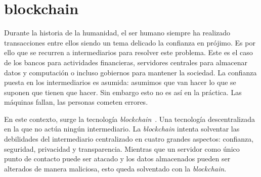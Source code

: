 \chapter{blockchain}\label{sec:blockchain}

Durante la historia de la humanidad, el ser humano siempre ha realizado transacciones entre ellos siendo un tema delicado la confianza en prójimo. Es por ello que se recurren a intermediarios para resolver este problema. Este es el caso de los bancos para actividades financieras, servidores centrales para almacenar datos y computación o incluso gobiernos para mantener la sociedad. La confianza puesta en los intermediarios es asumida: asumimos que van hacer lo que se suponen que tienen que hacer. Sin embargo esto no es así en la práctica. Las máquinas fallan, las personas cometen errores.

En este contexto, surge la tecnología \textit{blockchain}~\cite{duc-2023}. Una tecnología descentralizada en la que no actúa ningún intermediario. La \textit{blockchain} intenta solventar las debilidades del intermediario centralizado en cuatro grandes aspectos: confianza, seguridad, privacidad y transparencia. Mientras que un servidor como único punto de contacto puede ser atacado y los datos almacenados pueden ser alterados de manera maliciosa, esto queda solventado con la \textit{blockchain}.

